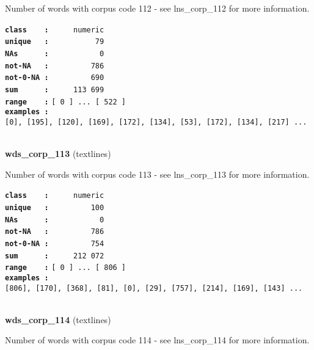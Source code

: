 \documentclass[]{article}
\begin{document}
Number of words with corpus code 112 - see lns\_corp\_112 for more
information.

\textbf{\texttt{class\ \ \ \ :}} \texttt{~~~~~numeric}\\
\textbf{\texttt{unique\ \ \ :}} \texttt{~~~~~~~~~~79}\\
\textbf{\texttt{NAs\ \ \ \ \ \ :}} \texttt{~~~~~~~~~~~0}\\
\textbf{\texttt{not-NA\ \ \ :}} \texttt{~~~~~~~~~786}\\
\textbf{\texttt{not-0-NA\ :}} \texttt{~~~~~~~~~690}\\
\textbf{\texttt{sum\ \ \ \ \ \ :}} \texttt{~~~~~113~699}\\
\textbf{\texttt{range\ \ \ \ :}}
\texttt{{[}\ 0\ {]}\ ...\ {[}\ 522\ {]}}\\
\textbf{\texttt{examples\ :}}
\texttt{{[}0{]},\ {[}195{]},\ {[}120{]},\ {[}169{]},\ {[}172{]},\ {[}134{]},\ {[}53{]},\ {[}172{]},\ {[}134{]},\ {[}217{]}\ ...}\\

~

\textbf{wds\_corp\_113} (textlines)

Number of words with corpus code 113 - see lns\_corp\_113 for more
information.

\textbf{\texttt{class\ \ \ \ :}} \texttt{~~~~~numeric}\\
\textbf{\texttt{unique\ \ \ :}} \texttt{~~~~~~~~~100}\\
\textbf{\texttt{NAs\ \ \ \ \ \ :}} \texttt{~~~~~~~~~~~0}\\
\textbf{\texttt{not-NA\ \ \ :}} \texttt{~~~~~~~~~786}\\
\textbf{\texttt{not-0-NA\ :}} \texttt{~~~~~~~~~754}\\
\textbf{\texttt{sum\ \ \ \ \ \ :}} \texttt{~~~~~212~072}\\
\textbf{\texttt{range\ \ \ \ :}}
\texttt{{[}\ 0\ {]}\ ...\ {[}\ 806\ {]}}\\
\textbf{\texttt{examples\ :}}
\texttt{{[}806{]},\ {[}170{]},\ {[}368{]},\ {[}81{]},\ {[}0{]},\ {[}29{]},\ {[}757{]},\ {[}214{]},\ {[}169{]},\ {[}143{]}\ ...}\\

~

\textbf{wds\_corp\_114} (textlines)

Number of words with corpus code 114 - see lns\_corp\_114 for more
information.
\end{document}
